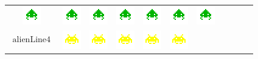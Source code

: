 \documentclass[french]{nakrule}
\begin{document}
\begin{table}[ht]
\begin{tabular}{c c c c c c c c c c c}
    \includegraphics[width=.05\textwidth]{pictures/aliens/green}&
    \includegraphics[width=.05\textwidth]{pictures/aliens/green}&
    \includegraphics[width=.05\textwidth]{pictures/aliens/green}&
    \includegraphics[width=.05\textwidth]{pictures/aliens/green}&
    \includegraphics[width=.05\textwidth]{pictures/aliens/green}&
    \includegraphics[width=.05\textwidth]{pictures/aliens/green}&
    \includegraphics[width=.05\textwidth]{pictures/aliens/green}\\
    $\begin{matrix}\text{alienLine4}\\ \text{ }\end{matrix}$ & \includegraphics[width=.05\textwidth]{pictures/aliens/yellow}&
    \includegraphics[width=.05\textwidth]{pictures/aliens/yellow}&
    \includegraphics[width=.05\textwidth]{pictures/aliens/yellow}&
    \includegraphics[width=.05\textwidth]{pictures/aliens/yellow}&
    \includegraphics[width=.05\textwidth]{pictures/aliens/yellow}&

\end{tabular}
\end{table}
\end{document}
